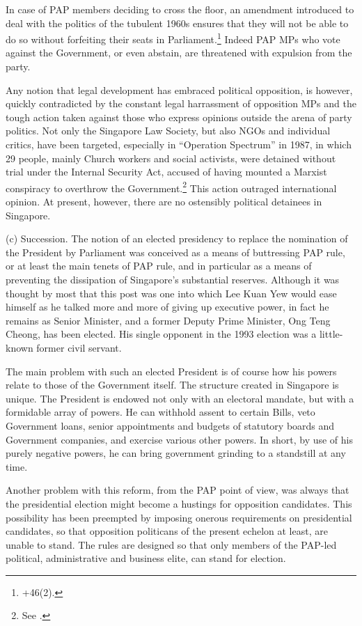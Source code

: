 In case of PAP members deciding to cross the floor, an amendment
introduced to deal with the politics of the tubulent 1960s
ensures that they will not be able to do so without forfeiting
their seats in Parliament.\footnote{ +{46(2)}.}
Indeed PAP MPs who vote against the Government, or even abstain,
are threatened with expulsion from the party.

Any notion that legal development has embraced political
opposition, is however, quickly contradicted by the constant
legal harrassment of opposition MPs and the tough action taken
against those who express opinions outside the arena of party
politics. Not only the Singapore Law Society, but also NGOs and
individual critics, have been targeted, especially in ``Operation
Spectrum'' in 1987, in which 29 people, mainly Church workers and
social activists, were detained without trial under the Internal
Security Act, accused of having mounted a Marxist conspiracy to
overthrow the Government.\footnote{ See .}
This action outraged international opinion. At present, however,
there are no ostensibly political detainees in Singapore.

(c) Succession.
     The notion of an elected presidency to replace the nomination
of the President by Parliament was conceived as a means of
buttressing PAP rule, or at least the main tenets of PAP rule, and
in particular as a means of preventing the dissipation of
Singapore's substantial reserves. Although it was thought by most
that this post was one into which Lee Kuan Yew would ease himself
as he talked more and more of giving up executive power, in fact he
remains as Senior Minister, and a former Deputy Prime Minister, Ong
Teng Cheong, has been elected. His single opponent in the 1993
election was a little-known former civil servant.

The main problem with such an elected President is of course how
his powers relate to those of the Government itself. The
structure created in Singapore is unique. The President is
endowed not only with an electoral mandate, but with a formidable
array of powers. He can withhold assent to certain Bills, veto
Government loans, senior appointments and budgets of statutory
boards and Government companies, and exercise various other
powers. In short, by use of his purely negative powers, he can
bring government grinding to a standstill at any time.

Another problem with this reform, from the PAP point of view, was
always that the presidential election might become a hustings for
opposition candidates. This possibility has been preempted by
imposing onerous requirements on presidential candidates, so that
opposition politicans of the present echelon at least, are unable
to stand. The rules are designed so that only members of the
PAP-led political, administrative and business elite, can stand
for election.

